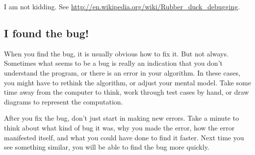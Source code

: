 \documentclass[12pt]{book}
\theoremstyle{exercise}
\begin{document}
I am not kidding.  See
\url{http://en.wikipedia.org/wiki/Rubber_duck_debugging}.


\subsection*{I found the bug!}

When you find the bug, it is usually obvious how to fix it.  But not
always.  Sometimes what seems to be a bug is really an indication that
you don't understand the program, or there is an error in your
algorithm.  In these cases, you might have to rethink the algorithm,
or adjust your mental model.  Take some time away from
the computer to think, work through test cases
by hand, or draw diagrams to represent the computation.

After you fix the bug, don't just start in making new errors.
Take a minute to think about what kind of bug it was, why you made
the error, how the error manifested itself, and
what you could have done to find it faster.  Next time you see something
similar, you will be able to find the bug more quickly.


\printindex

\clearemptydoublepage
\end{document}
